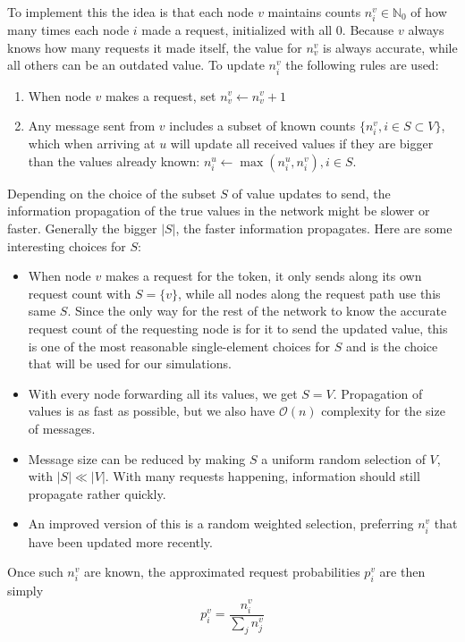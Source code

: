 \documentclass[a4paper, oneside]{discothesis}
\begin{document}
To implement this the idea is that each node $v$ maintains counts $n_i^v\in\mathbb{N}_0$ of how many times each node $i$ made a request, initialized with all $0$. Because $v$ always knows how many requests it made itself, the value for $n_v^v$ is always accurate, while all others can be an outdated value. To update $n_i^v$ the following rules are used:
\begin{enumerate}
\item When node $v$ makes a request, set $n_v^v\gets n_v^v+1$
\label{rule1}
\item Any message sent from $v$ includes a subset of known counts $\{n_i^v,i\in S\subset V\}$, which when arriving at $u$ will update all received values if they are bigger than the values already known: $n_i^u\gets \max(n_i^u,n_i^v),i\in S$.
\end{enumerate}

Depending on the choice of the subset $S$ of value updates to send, the information propagation of the true values in the network might be slower or faster. Generally the bigger $|S|$, the faster information propagates. Here are some interesting choices for $S$:
\begin{itemize}
\item When node $v$ makes a request for the token, it only sends along its own request count with $S=\{v\}$, while all nodes along the request path use this same $S$. Since the only way for the rest of the network to know the accurate request count of the requesting node is for it to send the updated value, this is one of the most reasonable single-element choices for $S$ and is the choice that will be used for our simulations.
\item With every node forwarding all its values, we get $S=V$. Propagation of values is as fast as possible, but we also have $\mathcal{O}(n)$ complexity for the size of messages.
\item Message size can be reduced by making $S$ a uniform random selection of $V$, with $|S|\ll|V|$. With many requests happening, information should still propagate rather quickly.
\item An improved version of this is a random weighted selection, preferring $n_i^v$ that have been updated more recently.
\end{itemize}

Once such $n_i^v$ are known, the approximated request probabilities $p_i^v$ are then simply
\begin{equation}
p_i^v=\frac{n_i^v}{\sum_jn_j^v}
\end{equation}
\end{document}
